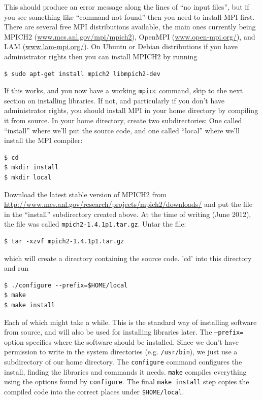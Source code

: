 \documentclass[12pt]{article}
\begin{document}
This should produce an error message along the lines of ``no input files'', but
if you see something like ``command not found'' then you need to install MPI first. 
There are several free MPI distributions available, the main ones currently being
MPICH2 (\url{www.mcs.anl.gov/mpi/mpich2}), OpenMPI (\url{www.open-mpi.org/}),
and LAM (\url{www.lam-mpi.org/}).
On Ubuntu or Debian distributions if you have administrator rights then 
you can install MPICH2 by running
\begin{verbatim}
$ sudo apt-get install mpich2 libmpich2-dev
\end{verbatim}

If this works, and you now have a working \texttt{mpicc} command, 
skip to the next section on installing libraries. If not, and 
particularly if you don't have administrator rights, you should
install MPI in your home directory by compiling it from source. 
In your home directory,
create two subdirectories: One called ``install'' where we'll put the source code, and one called ``local'' where we'll install the MPI compiler:
\begin{verbatim}
$ cd
$ mkdir install
$ mkdir local
\end{verbatim}

Download the latest stable version of MPICH2 from \url{http://www.mcs.anl.gov/research/projects/mpich2/downloads/} and put the file in the ``install'' subdirectory created above. At the time of writing (June 2012), the file was 
called \texttt{mpich2-1.4.1p1.tar.gz}. Untar the file:
\begin{verbatim}
$ tar -xzvf mpich2-1.4.1p1.tar.gz
\end{verbatim}
which will create a directory containing the source code. 'cd' into this directory and run
\begin{verbatim}
$ ./configure --prefix=$HOME/local
$ make
$ make install
\end{verbatim}
Each of which might take a while. This is the standard way of installing software from source, and will also be used for installing libraries later. The \texttt{--prefix=} option specifies
where the software should be installed. Since we don't have permission
to write in the system directories (e.g. \texttt{/usr/bin}), we just use a subdirectory of our home directory. The \texttt{configure} command configures the
install, finding the libraries and commands it needs. \texttt{make} compiles everything using the options found by \texttt{configure}. The final \texttt{make install} step copies the compiled code into the correct places under \texttt{\$HOME/local}. 
\end{document}
